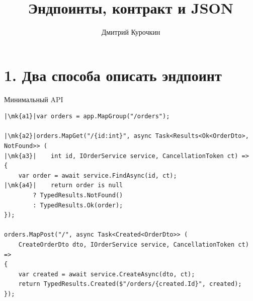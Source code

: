 \documentclass[aspectratio=169,10pt,t]{beamer}
\title[Л9. Эндпоинты, контракт и JSON]{Эндпоинты, контракт и JSON}
\author{Дмитрий Курочкин}
\date{}
\newcommand{\termsm}{\ttfamily\fontsize{6.6}{7.9}\selectfont}
\newcommand{\mk}[1]{\tikz[remember picture,overlay]\coordinate (#1) at (0,0.55ex);}
\begin{document}

\begin{frame}[plain]
\end{frame}

\section{1. Два способа описать эндпоинт}

\begin{frame}[plain]
\end{frame}

\begin{frame}[fragile]{Минимальный API}
  \vspace{0.3em}
\begin{lstlisting}[style=csharp,basicstyle=\termsm,escapechar=|]
|\mk{a1}|var orders = app.MapGroup("/orders");

|\mk{a2}|orders.MapGet("/{id:int}", async Task<Results<Ok<OrderDto>, NotFound>> (
|\mk{a3}|    int id, IOrderService service, CancellationToken ct) =>
{
    var order = await service.FindAsync(id, ct);
|\mk{a4}|    return order is null
        ? TypedResults.NotFound()
        : TypedResults.Ok(order);
});

orders.MapPost("/", async Task<Created<OrderDto>> (
    CreateOrderDto dto, IOrderService service, CancellationToken ct) =>
{
    var created = await service.CreateAsync(dto, ct);
    return TypedResults.Created($"/orders/{created.Id}", created);
});
\end{lstlisting}

\end{frame}
\end{document}
